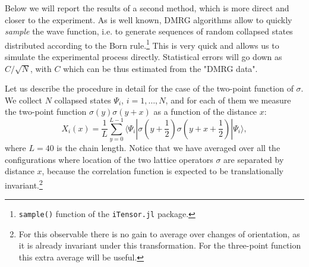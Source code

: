 \documentclass[a4paper,11pt]{article}
\newcommand{\beq}{\begin{equation}}
\newcommand{\eeq}{\end{equation}}
\theoremstyle{remark}
\theoremstyle{theorem}
\begin{document}
Below we will report the results of a second method, which is more direct and closer to the experiment. As is well known, DMRG algorithms allow to quickly \emph{sample} the wave function, i.e. to generate sequences of random collapsed states distributed according to the Born rule.\footnote{{\tt sample()} function of the {\tt iTensor.jl} package.} This is very quick and allows us to simulate the experimental process directly. Statistical errors will go down as $C/\sqrt{N}$, with $C$ which can be thus estimated from the "DMRG data".

Let us describe the procedure in detail for the case of the two-point function of $\sigma$. We collect $N$ collapsed states $\Psi_i$, $i=1,\ldots,N$, and for each of them we measure the two-point function $\sigma(y)\sigma(y+x)$ as a function of the distance $x$:
\beq\label{sample}
X_{i}(x)=\frac{1}{L} \sum_{y=0}^{L-1} \langle \Psi_i|\sigma(y+\frac 12)\sigma(y+x +\frac 12 )|\Psi_i\rangle,
\eeq
where $L=40$ is the chain length. Notice that we have averaged over all the configurations where location of the two lattice operators $\sigma$ are separated by distance $x$, because the correlation function is expected to be translationally invariant.\footnote{For this observable there is no gain to average over changes of orientation, as it is already invariant under this transformation. For the three-point function this extra average will be useful.}
\end{document}

